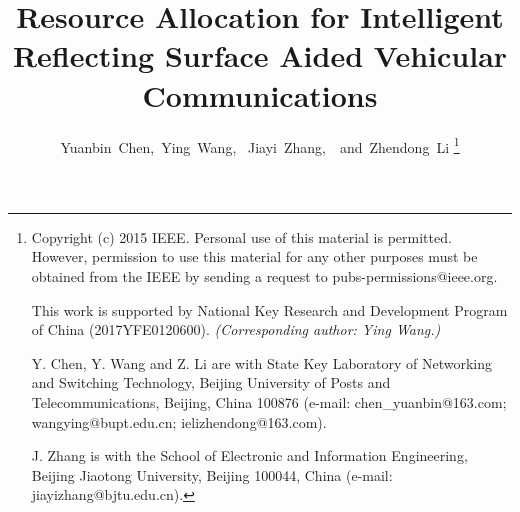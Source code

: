 \documentclass[journal]{IEEEtran}
\begin{document}
%
\title{Resource Allocation for Intelligent Reflecting Surface Aided Vehicular Communications}
%
%
%

\author{Yuanbin~Chen,~Ying~Wang,~
        Jiayi~Zhang,~~and~Zhendong~Li%
\thanks{Copyright (c) 2015 IEEE. Personal use of this material is permitted. However, permission to use this material for any other purposes must be obtained from the IEEE by sending a request to pubs-permissions@ieee.org.
	
	This work is supported by National Key Research and Development Program of China (2017YFE0120600). \textit{(Corresponding author: Ying Wang.)}
	
	Y. Chen, Y. Wang and Z. Li are with State Key Laboratory of Networking and Switching Technology, Beijing University of Posts and Telecommunications, Beijing, China 100876 (e-mail: chen\_yuanbin@163.com; wangying@bupt.edu.cn; ielizhendong@163.com).
	
J. Zhang is with the School of Electronic and Information Engineering, Beijing Jiaotong University, Beijing 100044, China (e-mail: jiayizhang@bjtu.edu.cn).}%
}


\maketitle
\end{document}
